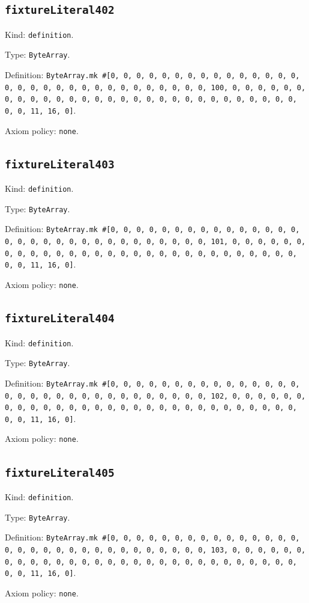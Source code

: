 \documentclass[11pt]{article}
\begin{document}
\subsection*{\texttt{fixtureLiteral402}}
\noindent Kind: \texttt{definition}.\par
\noindent Type: \texttt{ByteArray}.\par
\noindent Definition: \texttt{ByteArray.mk \#[0, 0, 0, 0, 0, 0, 0, 0, 0, 0, 0, 0, 0, 0, 0, 0, 0, 0, 0, 0, 0, 0, 0, 0, 0, 0, 0, 0, 0, 0, 0, 100, 0, 0, 0, 0, 0, 0, 0, 0, 0, 0, 0, 0, 0, 0, 0, 0, 0, 0, 0, 0, 0, 0, 0, 0, 0, 0, 0, 0, 0, 0, 0, 11, 16, 0]}.\par
\noindent Axiom policy: \texttt{none}.\par
\subsection*{\texttt{fixtureLiteral403}}
\noindent Kind: \texttt{definition}.\par
\noindent Type: \texttt{ByteArray}.\par
\noindent Definition: \texttt{ByteArray.mk \#[0, 0, 0, 0, 0, 0, 0, 0, 0, 0, 0, 0, 0, 0, 0, 0, 0, 0, 0, 0, 0, 0, 0, 0, 0, 0, 0, 0, 0, 0, 0, 101, 0, 0, 0, 0, 0, 0, 0, 0, 0, 0, 0, 0, 0, 0, 0, 0, 0, 0, 0, 0, 0, 0, 0, 0, 0, 0, 0, 0, 0, 0, 0, 11, 16, 0]}.\par
\noindent Axiom policy: \texttt{none}.\par
\subsection*{\texttt{fixtureLiteral404}}
\noindent Kind: \texttt{definition}.\par
\noindent Type: \texttt{ByteArray}.\par
\noindent Definition: \texttt{ByteArray.mk \#[0, 0, 0, 0, 0, 0, 0, 0, 0, 0, 0, 0, 0, 0, 0, 0, 0, 0, 0, 0, 0, 0, 0, 0, 0, 0, 0, 0, 0, 0, 0, 102, 0, 0, 0, 0, 0, 0, 0, 0, 0, 0, 0, 0, 0, 0, 0, 0, 0, 0, 0, 0, 0, 0, 0, 0, 0, 0, 0, 0, 0, 0, 0, 11, 16, 0]}.\par
\noindent Axiom policy: \texttt{none}.\par
\subsection*{\texttt{fixtureLiteral405}}
\noindent Kind: \texttt{definition}.\par
\noindent Type: \texttt{ByteArray}.\par
\noindent Definition: \texttt{ByteArray.mk \#[0, 0, 0, 0, 0, 0, 0, 0, 0, 0, 0, 0, 0, 0, 0, 0, 0, 0, 0, 0, 0, 0, 0, 0, 0, 0, 0, 0, 0, 0, 0, 103, 0, 0, 0, 0, 0, 0, 0, 0, 0, 0, 0, 0, 0, 0, 0, 0, 0, 0, 0, 0, 0, 0, 0, 0, 0, 0, 0, 0, 0, 0, 0, 11, 16, 0]}.\par
\noindent Axiom policy: \texttt{none}.\par
\end{document}
